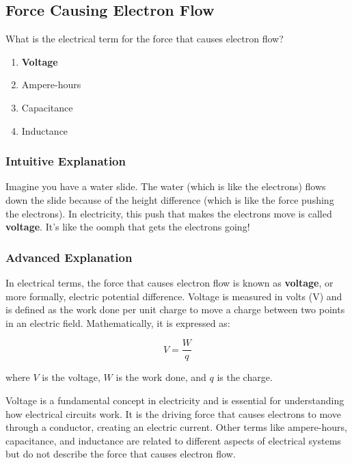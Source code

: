 \subsection{Force Causing Electron Flow}
\label{T5A05}

\begin{tcolorbox}[colback=gray!10!white,colframe=black!75!black,title=T5A05]
What is the electrical term for the force that causes electron flow?
\begin{enumerate}[label=\Alph*)]
    \item \textbf{Voltage}
    \item Ampere-hours
    \item Capacitance
    \item Inductance
\end{enumerate}
\end{tcolorbox}

\subsubsection{Intuitive Explanation}
Imagine you have a water slide. The water (which is like the electrons) flows down the slide because of the height difference (which is like the force pushing the electrons). In electricity, this push that makes the electrons move is called \textbf{voltage}. It's like the oomph that gets the electrons going!

\subsubsection{Advanced Explanation}
In electrical terms, the force that causes electron flow is known as \textbf{voltage}, or more formally, electric potential difference. Voltage is measured in volts (V) and is defined as the work done per unit charge to move a charge between two points in an electric field. Mathematically, it is expressed as:

\[
V = \frac{W}{q}
\]

where \( V \) is the voltage, \( W \) is the work done, and \( q \) is the charge. 

Voltage is a fundamental concept in electricity and is essential for understanding how electrical circuits work. It is the driving force that causes electrons to move through a conductor, creating an electric current. Other terms like ampere-hours, capacitance, and inductance are related to different aspects of electrical systems but do not describe the force that causes electron flow.

